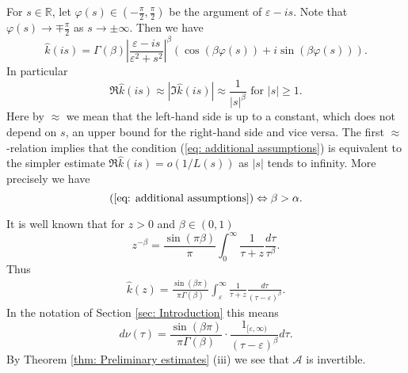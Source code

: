 \documentclass{amsart}
\newcommand{\abs}[1]{\left|#1\right|}
\newcommand{\A}{\mathcal{A}}
\newcommand{\khat}{\hat{k}}
\newcommand{\R}{\mathbb{R}}
\begin{document}
For $s\in\R$, let $\varphi(s)\in(-\frac{\pi}{2},\frac{\pi}{2})$ be the argument of $\varepsilon-is$. Note that $\varphi(s)\rightarrow\mp\frac{\pi}{2}$ as $s\rightarrow\pm\infty$. Then we have
\begin{equation}\nonumber
 \khat(is) = \Gamma(\beta)\abs{\frac{\varepsilon-is}{\varepsilon^2+s^2}}^{\beta}\left(\cos(\beta\varphi(s)) + i\sin(\beta\varphi(s))\right) .
\end{equation}
In particular
\begin{equation}\nonumber
 \Re\khat(is) \approx \abs{\Im\khat(is)} \approx \frac{1}{\abs{s}^{\beta}} \text{ for } \abs{s}\geq 1 .
\end{equation}
Here by $\approx$ we mean that the left-hand side is up to a constant, which does not depend on $s$, an upper bound for the right-hand side and vice versa. The first $\approx$-relation implies that the condition (\ref{eq: additional assumptions}) is equivalent to the simpler estimate $\Re\khat(is)=o(1/L(s))$ as $\abs{s}$ tends to infinity. More precisely we have
\begin{equation}\label{eq: standard additional assumptions}
 (\ref{eq: additional assumptions}) \Leftrightarrow \beta > \alpha .
\end{equation}

It is well known that for $z>0$ and $\beta\in(0,1)$
\begin{equation}\nonumber
 z^{-\beta} = \frac{\sin(\pi \beta)}{\pi} \int_0^{\infty} \frac{1}{\tau+z} \frac{d\tau}{\tau^{\beta}} .
\end{equation}
Thus
\begin{align*}
 \khat(z) = \frac{\sin(\beta\pi)}{\pi\Gamma(\beta)} \int_{\varepsilon}^{\infty} \frac{1}{\tau+z} \frac{d\tau}{(\tau-\varepsilon)^{\beta}} .
\end{align*}
In the notation of Section \ref{sec: Introduction} this means
\begin{equation}\nonumber
 d\nu(\tau) = \frac{\sin(\beta\pi)}{\pi\Gamma(\beta)}\cdot \frac{1_{[\varepsilon,\infty)}}{(\tau-\varepsilon)^{\beta}} d\tau .
\end{equation}
By Theorem \ref{thm: Preliminary estimates} (iii) we see that $\A$ is invertible.
\end{document}
